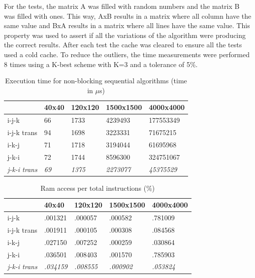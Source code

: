 \documentclass[a4paper]{report}
\begin{document}
For the tests, the matrix A was filled with random numbers and the matrix B was
filled with ones. This way, AxB results in a matrix where all column have the
same value and BxA results in a matrix where all lines have the same value. This
property was used to assert if all the variations of the algorithm were producing
the correct results. After each test the cache was cleared to ensure all the
tests used a cold cache. To reduce the outliers, the time measurements were
performed 8 times using a K-best scheme with K=3 and a tolerance of 5\%.

\begin{table}[H]
\centering
\begin{tabular}{|l|l|l|l|l|}
\hline
            & 40x40 & 120x120 & 1500x1500 & 4000x4000 \\ \hline
i-j-k       & 66    & 1733    & 4239493   & 177553349 \\ \hline
i-j-k trans & 94    & 1698    & 3223331   & 71675215  \\ \hline
i-k-j       & 71    & 1718    & 3194044   & 61695968  \\ \hline
j-k-i       & 72    & 1744    & 8596300   & 324751067 \\ \hline
\textit{j-k-i trans} & \textit{69}    & \textit{1375}    & \textit{2273077}   &
\textit{45375529}  \\ \hline
\end{tabular}
\caption{Execution time for non-blocking sequential algorithms (time in $\mu$s)}
\end{table}

\begin{table}[H]
\centering
\begin{tabular}{|l|l|l|l|l|}
\hline
            & 40x40   & 120x120 & 1500x1500 & 4000x4000 \\ \hline
i-j-k       & .001321 & .000057 & .000582   & .781009   \\ \hline
i-j-k trans & .001911 & .000105 & .000308   & .084568   \\ \hline
i-k-j       & .027150 & .007252 & .000259   & .030864   \\ \hline
j-k-i       & .036501 & .008403 & .001570   & .785903   \\ \hline
\textit{j-k-i trans} & \textit{.034159} & \textit{.008555} & \textit{.000902}
                     & \textit{.053824}   \\ \hline
\end{tabular}
\caption{Ram access per total instructions (\%)}
\end{table}
\end{document}
